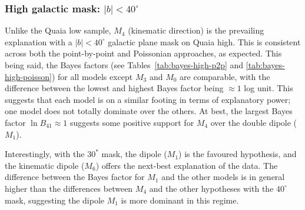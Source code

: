 \documentclass[fleqn,usenatbib]{mnras}
\begin{document}
        \subsubsection{High galactic mask: $|b| < 40^\circ$}
            \label{subs:high-gal-masks-high}
            Unlike the Quaia low sample, $M_4$ (kinematic direction) is the prevailing explanation with a $|b| < 40^\circ$ galactic plane mask on Quaia high.
            This is consistent across both the point-by-point and Poissonian approaches, as expected.
            This being said, the Bayes factors (see Tables~\ref{tab:bayes-high-p2p} and \ref{tab:bayes-high-poisson}) for all models  except $M_3$ and $M_0$ are comparable, with the difference between the lowest and highest Bayes factor being $\approx 1$ log unit.
            This suggests that each model is on a similar footing in terms of explanatory power; one model does not totally dominate over the others.
            At best, the largest Bayes factor $\ln B_{41} \approx 1$ suggests some positive support for $M_4$ over the double dipole ($M_1$).

            Interestingly, with the $30^*$ mask, the dipole ($M_1$) is the favoured hypothesis, and the kinematic dipole ($M_6$) offers the next-best explanation of the data.
            The difference between the Bayes factor for $M_1$ and the other models is in general higher than the differences between $M_4$ and the other hypotheses with the $40^\circ$ mask, suggesting the dipole $M_1$ is more dominant in this regime.
            

            
\end{document}
